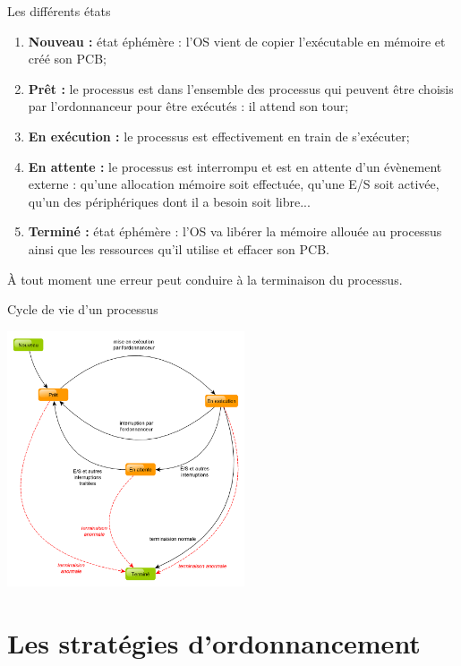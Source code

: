 \documentclass[10pt]{beamer}
\begin{document}
\begin{frame}{Les différents états}
\begin{enumerate}[--]
	\item \textbf{Nouveau : } état éphémère : l'OS vient de copier l'exécutable en mémoire et créé son PCB;
    \item \textbf{Prêt : } le processus est dans l'ensemble des processus qui peuvent être choisis par l'ordonnanceur pour être exécutés : il attend son tour;
    \item \textbf{En exécution :} le processus est effectivement en train de s'exécuter;
    \item \textbf{En attente :} le processus est interrompu et est en attente d'un évènement externe : qu'une allocation mémoire soit effectuée, qu'une E/S soit activée, qu'un des périphériques dont il a besoin soit libre...
    \item \textbf{Terminé :} état éphémère : l'OS va libérer la mémoire allouée au processus ainsi que les ressources qu'il utilise et effacer son PCB.
\end{enumerate}
À tout moment une erreur peut conduire à la terminaison du processus.
\end{frame}

\begin{frame}{Cycle de vie d'un processus}
\begin{center}
\includegraphics[width=7cm]{img/cycle_proc}
\end{center}
\end{frame}

\section{Les stratégies d'ordonnancement}
\end{document}
